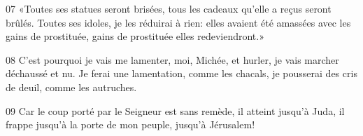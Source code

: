 
07 «Toutes ses statues seront brisées, tous les cadeaux qu’elle a reçus seront brûlés. Toutes ses idoles, je les réduirai à rien: elles avaient été amassées avec les gains de prostituée, gains de prostituée elles redeviendront.»

08 C’est pourquoi je vais me lamenter, moi, Michée, et hurler, je vais marcher déchaussé et nu. Je ferai une lamentation, comme les chacals, je pousserai des cris de deuil, comme les autruches.

09 Car le coup porté par le Seigneur est sans remède, il atteint jusqu’à Juda, il frappe jusqu’à la porte de mon peuple, jusqu’à Jérusalem!